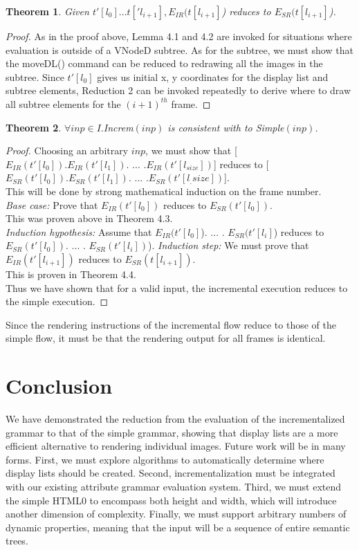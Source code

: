 \documentclass[11pt]{article}
\newtheorem{theorem}{Theorem}[section]
\begin{document}
\begin{theorem} Given $t'[l_0]...t['l_{i+1}], E_{IR}(t[l_{i+1}]$) reduces to $E_{SR}(t[l_{i+1}]$). \end{theorem}
\begin{proof}
As in the proof above, Lemma 4.1 and 4.2 are invoked for situations where evaluation is outside of a VNodeD subtree. As for the subtree, we must show that the moveDL() command can be reduced to redrawing all the images in the subtree. Since $t'[l_0]$ gives us initial x, y coordinates for the display list and subtree elements, Reduction 2 can be invoked repeatedly to derive where to draw all subtree elements for the $(i+1)^{th}$ frame. 
\end{proof}

\begin{theorem} $\forall inp \in I. $Increm$(inp)$ is consistent with to Simple$(inp)$. \end{theorem}
\begin{proof}
Choosing an arbitrary $inp$, we must show that [$E_{IR}(t'[l_0]).E_{IR}(t'[l_1]).$ $...$ $.E_{IR}(t'[l_{size}])$] reduces to [$E_{SR}(t'[l_0]).E_{SR}(t'[l_1]).$ $...$ $.E_{SR}(t'[l_.{size}])$].\\
This will be done by strong mathematical induction on the frame number.\\
\emph{Base case:} Prove that $E_{IR}(t'[l_0])$ reduces to $E_{SR}(t'[l_0])$.\\
This was proven above in Theorem 4.3.\\
\emph{Induction hypothesis:} Assume that $E_{IR}(t'[l_0]$). $...$ . $E_{SR}(t'[l_i]$) reduces to $E_{SR}(t'[l_0])$. $...$ . $E_{SR}(t'[l_i])$).
\emph{Induction step:} We must prove that $E_{IR}(t'[l_{i + 1}])$ reduces to $E_{SR}(t[l_{i + 1}])$.\\
This is proven in Theorem 4.4.\\
Thus we have shown that for a valid input, the incremental execution reduces to the simple execution.
\end{proof}

Since the rendering instructions of the incremental flow reduce to those of the simple flow, it must be that the rendering output for all frames is identical.

\section{Conclusion}
We have demonstrated the reduction from the evaluation of the incrementalized grammar to that of the simple grammar, showing that display lists are a more efficient alternative to rendering individual images. Future work will be in many forms. First, we must explore algorithms to automatically determine where display lists should be created. Second, incrementalization must be integrated with our existing attribute grammar evaluation system. Third, we must extend the simple HTML0 to encompass both height and width, which will introduce another dimension of complexity. Finally, we must support arbitrary numbers of dynamic properties, meaning that the input will be a sequence of entire semantic trees.
\end{document}
